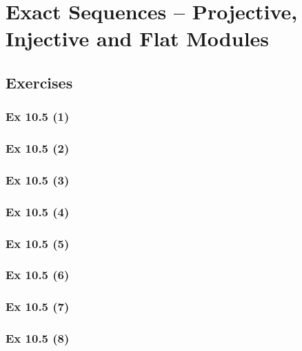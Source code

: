 \newpage		%

\section{Exact Sequences -- Projective, Injective and Flat Modules}\label{sec:10.5}	
\subsection*{Exercises}\label{sec:10.5_Exercises}

\subsubsection{Ex 10.5 (1)}\label{sec:Ex_10.5.1}

\subsubsection{Ex 10.5 (2)}\label{sec:Ex_10.5.2}

\subsubsection{Ex 10.5 (3)}\label{sec:Ex_10.5.3}

\subsubsection{Ex 10.5 (4)}\label{sec:Ex_10.5.4}

\subsubsection{Ex 10.5 (5)}\label{sec:Ex_10.5.5}

\subsubsection{Ex 10.5 (6)}\label{sec:Ex_10.5.6}

\subsubsection{Ex 10.5 (7)}\label{sec:Ex_10.5.7}

\subsubsection{Ex 10.5 (8)}\label{sec:Ex_10.5.8}


